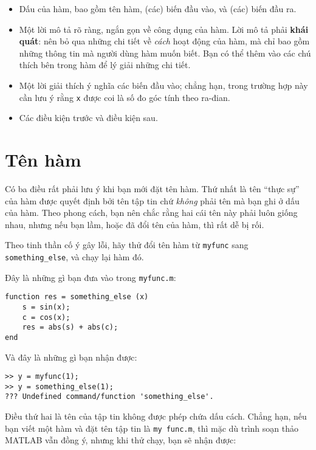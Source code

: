 \documentclass[12pt]{book}
\begin{document}
\begin{itemize}

\item Dấu của hàm, bao gồm tên hàm, (các) biến đầu vào, và
(các) biến đầu ra.

\item Một lời mô tả rõ ràng, ngắn gọn về công dụng của hàm. 
Lời mô tả phải {\bf khái quát}: nên bỏ qua những chi tiết về
{\em cách} hoạt động của hàm, mà chỉ bao gồm những thông tin 
mà người dùng hàm muốn biết. Bạn có thể thêm vào các chú thích
bên trong hàm để lý giải những chi tiết.

\item Một lời giải thích ý nghĩa các biến đầu vào; chẳng hạn,
trong trường hợp này cần lưu ý rằng {\tt x} được coi là số đo góc
tính theo ra-đian.

\item Các điều kiện trước và điều kiện sau.

\end{itemize}



\section{Tên hàm}

Có ba điều rất phải lưu ý khi bạn mới đặt tên hàm. Thứ nhất là tên 
``thực sự'' của hàm được quyết định bởi tên tập tin chứ {\em không}
phải tên mà bạn ghi ở dấu của hàm. Theo phong cách, bạn nên
chắc rằng hai cái tên này phải luôn giống nhau, nhưng nếu bạn
lầm, hoặc đã đổi tên của hàm, thì rất dễ bị rối.

Theo tinh thần cố ý gây lỗi, hãy thử đổi tên hàm từ
{\tt myfunc} sang \verb#something_else#, và chạy lại hàm đó.

Đây là những gì bạn đưa vào trong {\tt myfunc.m}:

\begin{verbatim}
function res = something_else (x)
    s = sin(x);
    c = cos(x);
    res = abs(s) + abs(c);
end
\end{verbatim}

Và đây là những gì bạn nhận được:

\begin{verbatim}
>> y = myfunc(1);
>> y = something_else(1);
??? Undefined command/function 'something_else'.
\end{verbatim}

Điều thứ hai là tên của tập tin không được phép chứa dấu cách.
Chẳng hạn, nếu bạn viết một hàm và đặt tên tập tin là {\tt my func.m},
thì mặc dù trình soạn thảo MATLAB vẫn đồng ý, nhưng khi thử chạy,
bạn sẽ nhận được:
\end{document}
